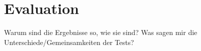 \section{Evaluation}
\label{evaluation}

Warum sind die Ergebnisse so, wie sie sind? Was sagen mir die Unterschiede/Gemeinsamkeiten der Tests?